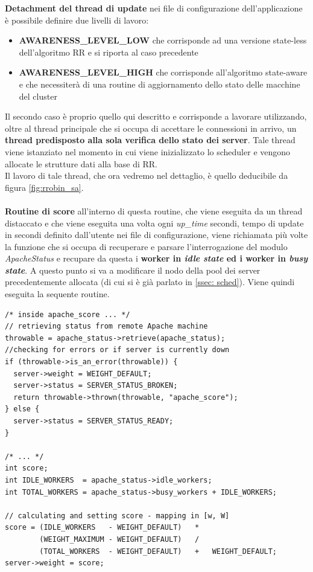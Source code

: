 \documentclass[italian]{tktltiki2}
\begin{document}
\textbf{Detachment del thread di update} nei file di configurazione dell'applicazione è possibile definire due livelli di lavoro:
	\begin{itemize}
		\item \textbf{AWARENESS\_LEVEL\_LOW} che corrisponde ad una versione state-less dell'algoritmo RR e si riporta al caso precedente
		\item \textbf{AWARENESS\_LEVEL\_HIGH} che corrisponde all'algoritmo state-aware e che necessiterà di una routine di aggiornamento dello stato delle macchine del cluster
	\end{itemize}
	Il secondo caso è proprio quello qui descritto e corrisponde a lavorare utilizzando, oltre al thread principale che si occupa di accettare le connessioni in arrivo, un \textbf{thread predisposto alla sola verifica dello stato dei server}. Tale thread viene istanziato nel momento in cui viene inizializzato lo scheduler e vengono allocate le strutture dati alla base di RR. \\
	Il lavoro di tale thread, che ora vedremo nel dettaglio, è quello deducibile da figura \ref{fig:rrobin_sa}.\\\\
\textbf{Routine di score} all'interno di questa routine, che viene eseguita da un thread distaccato e che viene eseguita una volta ogni \emph{up\_time} secondi, tempo di update in secondi definito dall'utente nei file di configurazione, viene richiamata più volte la funzione che si occupa di recuperare e parsare l'interrogazione del modulo \emph{ApacheStatus} e recupare da questa i \textbf{worker in \emph{idle state} ed i worker in \emph{busy state}}. A questo punto si va a modificare il nodo della pool dei server precedentemente allocata (di cui si è già parlato in \ref{ssec: sched}). Viene quindi eseguita la sequente routine. \\
\begin{lstlisting}
/* inside apache_score ... */
// retrieving status from remote Apache machine
throwable = apache_status->retrieve(apache_status);   
//checking for errors or if server is currently down
if (throwable->is_an_error(throwable)) {
  server->weight = WEIGHT_DEFAULT;
  server->status = SERVER_STATUS_BROKEN;
  return throwable->thrown(throwable, "apache_score");
} else {
  server->status = SERVER_STATUS_READY;
}

/* ... */
int score;
int IDLE_WORKERS  = apache_status->idle_workers;
int TOTAL_WORKERS = apache_status->busy_workers + IDLE_WORKERS;

// calculating and setting score - mapping in [w, W]
score = (IDLE_WORKERS   - WEIGHT_DEFAULT)   *
        (WEIGHT_MAXIMUM - WEIGHT_DEFAULT)   /
        (TOTAL_WORKERS  - WEIGHT_DEFAULT)   +   WEIGHT_DEFAULT;
server->weight = score;
\end{lstlisting}
\end{document}

